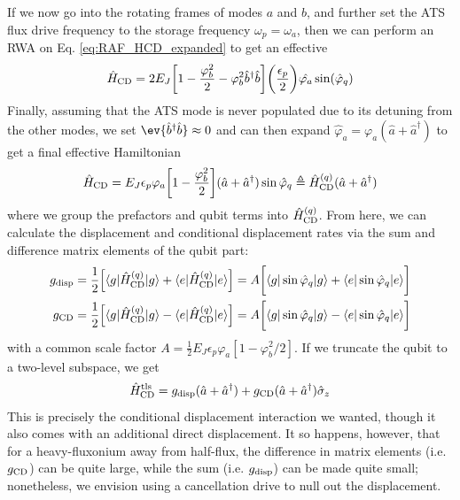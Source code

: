If we now go into the rotating frames of modes $a$ and $b$, and further set the ATS flux drive frequency to the storage frequency $\omega_p = \omega_a$, then we can perform an RWA on Eq. \eqref{eq:RAF_HCD_expanded} to get an effective
\begin{equation}
    \hat{H}_{\rm CD} = 2E_J \bigg[1 - \frac{\varphi_b^2}{2} - \varphi_b^2\hat{b}^\dagger\hat{b}\bigg]\bigg(\frac{\epsilon_p}{2}\bigg)\hat{\varphi_a}\sin(\hat{\varphi}_q)
\end{equation}
Finally, assuming that the ATS mode is never populated due to its detuning from the other modes, we set $\ev{\hat{b}^\dagger\hat{b}} \approx 0$ and can then expand $\hat{\varphi}_a = \varphi_a(\hat{a} + \hat{a}^\dagger)$ to get a final effective Hamiltonian
\begin{equation}
    \hat{H}_{\rm CD} = E_J  \epsilon_p\varphi_a \bigg[1 - \frac{\varphi_b^2}{2} \bigg](\hat{a} + \hat{a}^\dagger)\sin\hat{\varphi}_q \triangleq \hat{H}_{\rm CD}^{(q)} (\hat{a} + \hat{a}^\dagger)
\end{equation}
where we group the prefactors and qubit terms into $\hat{H}_{\rm CD}^{(q)}$. From here, we can calculate the displacement and conditional displacement rates via the sum and difference matrix elements of the qubit part:
\begin{align}
    \begin{split}
        g_\mathrm{disp} &= \frac{1}{2}\Big[\langle g|\hat{H}_{\rm CD}^{(q)}|g\rangle + \langle e|\hat{H}_{\rm CD}^{(q)}|e\rangle \Big] = A\bigg[\langle g|\sin\hat{\varphi}_q|g\rangle + \langle e|\sin\hat{\varphi}_q|e\rangle\bigg] \\
        g_{\rm CD} &= \frac{1}{2}\Big[\langle g|\hat{H}_{\rm CD}^{(q)}|g\rangle - \langle e|\hat{H}_{\rm CD}^{(q)}|e\rangle \Big] = A\bigg[\langle g|\sin\hat{\varphi}_q|g\rangle - \langle e|\sin\hat{\varphi}_q|e\rangle\bigg]
    \end{split}
\end{align}
with a common scale factor $A = \frac{1}{2}E_J\epsilon_p   \varphi_a[1 - \varphi_b^2/2]$. If we truncate the qubit to a two-level subspace, we get
\begin{equation}
    \hat{H}_{\rm CD}^{\rm tls} = g_{\rm disp} (\hat{a}+\hat{a}^\dagger) + g_{\rm CD} (\hat{a}+\hat{a}^\dagger)\hat{\sigma}_z
\end{equation}
This is precisely the conditional displacement interaction we wanted, though it also comes with an additional direct displacement. It so happens, however, that for a heavy-fluxonium away from half-flux, the difference in matrix elements (i.e. $g_{\rm CD}$) can be quite large, while the sum (i.e. $g_{\rm disp}$) can be made quite small; nonetheless, we envision using a cancellation drive to null out the displacement. 


